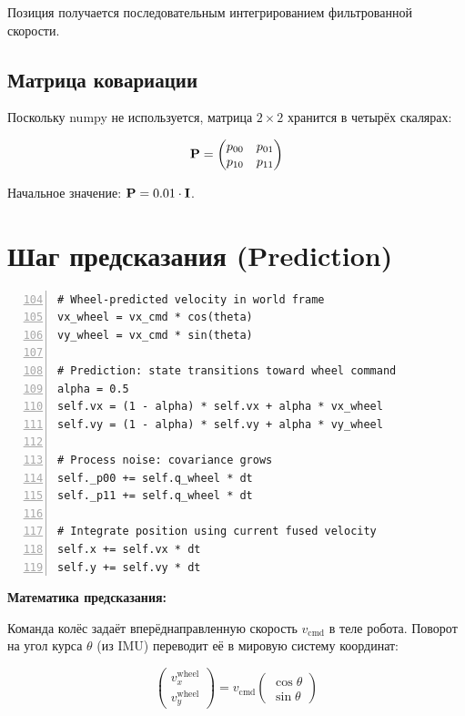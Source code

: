 Позиция получается последовательным интегрированием фильтрованной скорости.

\subsection{Матрица ковариации}

Поскольку numpy не используется, матрица $2\times 2$ хранится в четырёх скалярах:

\begin{equation}
  \mathbf{P} = \begin{pmatrix} p_{00} & p_{01} \\ p_{10} & p_{11} \end{pmatrix}
  \label{eq:cov_matrix}
\end{equation}

Начальное значение: $\mathbf{P} = 0.01 \cdot \mathbf{I}$.

\section{Шаг предсказания (Prediction)}
\label{sec:ekf_predict}

\begin{filebox}[title={\filepath{velocity\_ekf.py}, строки 90--120 --- predict\_wheel()}]
\begin{lstlisting}[style=pythonstyle, numbers=left, firstnumber=104]
# Wheel-predicted velocity in world frame
vx_wheel = vx_cmd * cos(theta)
vy_wheel = vx_cmd * sin(theta)

# Prediction: state transitions toward wheel command
alpha = 0.5
self.vx = (1 - alpha) * self.vx + alpha * vx_wheel
self.vy = (1 - alpha) * self.vy + alpha * vy_wheel

# Process noise: covariance grows
self._p00 += self.q_wheel * dt
self._p11 += self.q_wheel * dt

# Integrate position using current fused velocity
self.x += self.vx * dt
self.y += self.vy * dt
\end{lstlisting}
\end{filebox}

\textbf{Математика предсказания:}

Команда колёс задаёт вперёд\-направленную скорость $v_{\text{cmd}}$ в теле робота.
Поворот на угол курса $\theta$ (из IMU) переводит её в мировую систему координат:

\begin{equation}
  \begin{pmatrix} v_x^{\text{wheel}} \\ v_y^{\text{wheel}} \end{pmatrix}
  = v_{\text{cmd}} \begin{pmatrix} \cos\theta \\ \sin\theta \end{pmatrix}
  \label{eq:wheel_world}
\end{equation}

